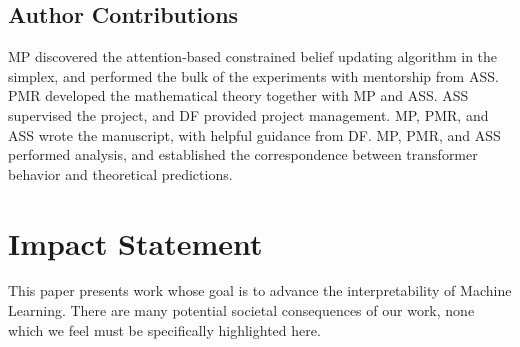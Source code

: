 \documentclass{article}
\theoremstyle{plain}
\theoremstyle{definition}
\theoremstyle{remark}
\begin{document}
\subsection*{Author Contributions}


MP discovered the attention-based constrained belief updating algorithm in the simplex, and performed the bulk of the experiments with mentorship from ASS.  PMR developed the mathematical theory together with MP and ASS.  ASS supervised the project, and DF provided project management.  MP, PMR, and ASS wrote the manuscript, with helpful guidance from DF.  MP, PMR, and ASS performed analysis, and established the correspondence between transformer behavior and theoretical predictions.
 


\section*{Impact Statement}
This paper presents work whose goal is to advance the interpretability of 
Machine Learning. There are many potential societal consequences 
of our work, none which we feel must be specifically highlighted here.



\end{document}
